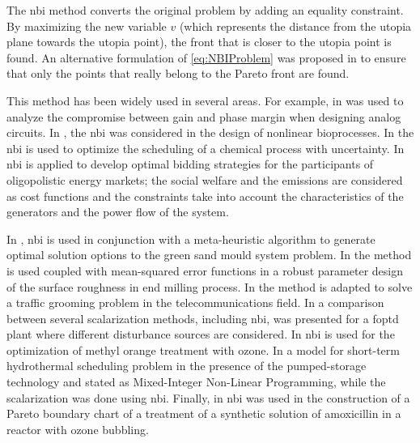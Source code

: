 The \gls{nbi} method converts the original problem by adding an equality constraint. By maximizing the new variable $v$ (which represents the distance from the utopia plane towards the utopia point), the front that is closer to the utopia point is found. An alternative formulation of \eqref{eq:NBIProblem} was proposed in \citet{Shukla2007} to ensure that only the points that really belong to the Pareto front are found.

This method has been widely used in several areas. For example, in \citet{Stehr2003} was used to analyze the compromise between gain and phase margin when designing analog circuits. In \citet{Sendin2004}, the \gls{nbi} was considered in the design of nonlinear bioprocesses. In \citet{Ierapetritou2007a} the \gls{nbi} is used to optimize the scheduling of a chemical process with uncertainty. In \citet{Vahidinasab2010} \gls{nbi} is applied to develop optimal bidding strategies for the participants of oligopolistic energy markets; the social welfare and the emissions are considered as cost functions and the constraints take into account the characteristics of the generators and the power flow of the system.

In \citet{Ganesan2013}, \gls{nbi} is used in conjunction with a meta-heuristic algorithm to generate optimal solution options to the green sand mould system problem. In \citet{Brito2014} the method is used coupled with mean-squared error functions in a robust parameter design of the surface roughness in end milling process. In \citet{Rubio-Largo2014} the method is adapted to solve a traffic grooming problem in the telecommunications field. In \citet{Rojas2015b} a comparison between several scalarization methods, including \gls{nbi}, was presented for a \gls{foptd} plant where different disturbance sources are considered. In \citet{Naves2017} \gls{nbi} is used for the optimization of methyl orange treatment with ozone. In \citet{Simab2018} a model for short-term hydrothermal scheduling problem in the presence of the pumped-storage technology and stated as Mixed-Integer Non-Linear Programming, while the scalarization was done using \gls{nbi}. Finally, in \citet{Moura2018} \gls{nbi} was used in the construction of a Pareto boundary chart of a treatment of a synthetic solution of amoxicillin in a reactor with ozone bubbling.
